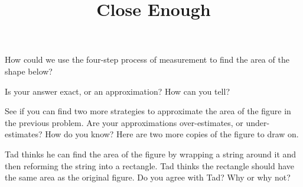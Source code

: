 \documentclass[nooutcomes,noauthor, handout]{ximera}
\title{Close Enough}
\begin{document}
\begin{abstract}
\end{abstract}

\maketitle


\begin{problem}
How could we use the four-step process of measurement to find the area of the shape below?
\begin{center}
\end{center}

Is your answer exact, or an approximation? How can you tell?
\end{problem}

\begin{problem}
See if you can find two more strategies to approximate the area of the figure in the previous problem.  Are your approximations over-estimates, or under-estimates? How do you know? Here are two more copies of the figure to draw on.
\begin{center}
\hspace{0.5in}
\end{center}

\end{problem}

\pagebreak

\begin{problem}
Tad thinks he can find the area of the figure by wrapping a string around it and then reforming the string into a rectangle. Tad thinks the rectangle should have the same area as the original figure. Do you agree with Tad? Why or why not?
\begin{center}
\end{center}
\end{problem}
\end{document}
